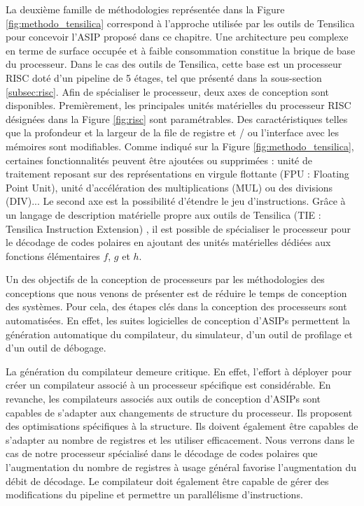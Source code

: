 La deuxième famille de méthodologies représentée dans la Figure \ref{fig:methodo_tensilica} correspond à l'approche utilisée par les outils de Tensilica pour concevoir l'ASIP proposé dans ce chapitre. Une architecture peu complexe en terme de surface occupée et à faible consommation constitue la brique de base du processeur. Dans le cas des outils de Tensilica, cette base est un processeur RISC doté d'un pipeline de 5 étages, tel que présenté dans la sous-section \ref{subsec:risc}. Afin de spécialiser le processeur, deux axes de conception sont disponibles. Premièrement, les principales unités matérielles du processeur RISC désignées dans la Figure \ref{fig:risc} sont paramétrables. Des caractéristiques telles que la profondeur et la largeur de la file de registre et / ou l'interface avec les mémoires sont modifiables. Comme indiqué sur la Figure \ref{fig:methodo_tensilica}, certaines fonctionnalités peuvent être ajoutées ou supprimées : unité de traitement reposant sur des représentations en virgule flottante (FPU : Floating Point Unit), unité d'accélération des multiplications (MUL) ou des divisions (DIV)... Le second axe est la possibilité d'étendre le jeu d'instructions. Grâce à un langage de description matérielle propre aux outils de Tensilica (TIE : Tensilica Instruction Extension) \cite{tie2017reference}, il est possible de spécialiser le processeur pour le décodage de codes polaires en ajoutant des unités matérielles dédiées aux fonctions élémentaires $f$, $g$ et $h$.

Un des objectifs de la conception de processeurs par les méthodologies des conceptions que nous venons de présenter est de réduire le temps de conception des systèmes. Pour cela, des étapes clés dans la conception des processeurs sont automatisées. En effet, les suites logicielles de conception d'ASIPs permettent la génération automatique du compilateur, du simulateur, d'un outil de profilage et d'un outil de débogage. 

La génération du compilateur demeure critique. En effet, l'effort à déployer pour créer un compilateur associé à un processeur spécifique est considérable. En revanche, les compilateurs associés aux outils de conception d'ASIPs sont capables de s'adapter aux changements de structure du processeur. Ils proposent des optimisations spécifiques à la structure. Ils doivent également être capables de s'adapter au nombre de registres et les utiliser efficacement. Nous verrons dans le cas de notre processeur spécialisé dans le décodage de codes polaires que l'augmentation du nombre de registres à usage général favorise l'augmentation du débit de décodage. Le compilateur doit également être capable de gérer des modifications du pipeline et permettre un parallélisme d'instructions.

